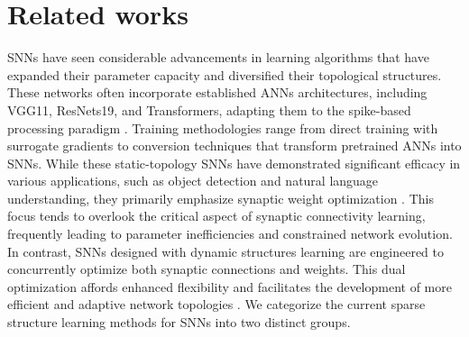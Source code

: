 \section{Related works}

SNNs have seen considerable advancements in learning algorithms that have expanded their parameter capacity and diversified their topological structures. These networks often incorporate established ANNs architectures, including VGG11, ResNets19, and Transformers, adapting them to the spike-based processing paradigm \citep{yao2024spike,hu2024advancing}. Training methodologies range from direct training with surrogate gradients to conversion techniques that transform pretrained ANNs into SNNs. While these static-topology SNNs have demonstrated significant efficacy in various applications, such as object detection and natural language understanding, they primarily emphasize synaptic weight optimization \citep{gast2024neural,zheng2024temporal,ren2024spiking}. This focus tends to overlook the critical aspect of synaptic connectivity learning, frequently leading to parameter inefficiencies and constrained network evolution. In contrast, SNNs designed with dynamic structures learning are engineered to concurrently optimize both synaptic connections and weights. This dual optimization affords enhanced flexibility and facilitates the development of more efficient and adaptive network topologies \citep{xu2024reversing,jiang2023adaptive,shen2024efficient}. We categorize the current sparse structure learning methods for SNNs into two distinct groups.


